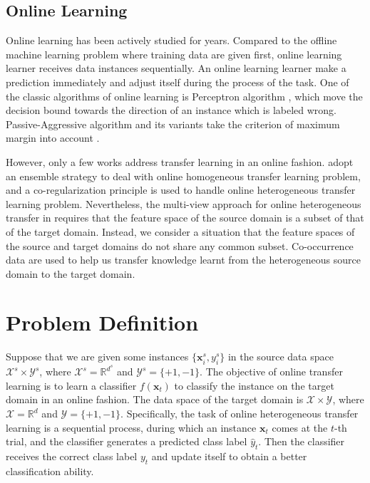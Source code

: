 \documentclass[letterpaper]{article}
\theoremstyle{remark}
\theoremstyle{definition}
\begin{document}
\subsection{Online Learning}
Online learning has been actively studied for years.
Compared to the offline machine learning problem where training data are given first, online learning learner receives data instances sequentially.
An online learning learner make a prediction immediately and adjust itself during the process of the task.
One of the classic algorithms of online learning is Perceptron algorithm \cite{rosenblatt1958perceptron}, which move the decision bound towards the direction of an instance which is labeled wrong.
Passive-Aggressive algorithm and its variants take the criterion of maximum margin into account \cite{crammer2006online}.

However, only a few works address transfer learning in an online fashion.
\cite{zhao2010otl,zhao2014online} adopt an ensemble strategy to deal with online homogeneous transfer learning problem, and a co-regularization principle is used to handle online heterogeneous transfer learning problem.
Nevertheless, the multi-view approach for online heterogeneous transfer in \cite{zhao2010otl,zhao2014online} requires that the feature space of the source domain is a subset of that of the target domain.
Instead, we consider a situation that the feature spaces of the source and target domains do not share any common subset.
Co-occurrence data are used to help us transfer knowledge learnt from the heterogeneous source domain to the target domain.

\section{Problem Definition}

Suppose that we are given some instances $\{\mathbf{x}_{i}^{s}, y_{i}^{s}\}$ in the source data space $\mathcal{X}^{s} \times \mathcal{Y}^{s}$, where $\mathcal{X}^{s} = \mathbb{R}^{d^s}$ and $\mathcal{Y}^{s} = \{+1,-1\}$.
The objective of online transfer learning is to learn a classifier $f(\mathbf{x}_{t})$ to classify the instance on the target domain in an online fashion.
The data space of the target domain is $\mathcal{X} \times \mathcal{Y}$, where $\mathcal{X} = \mathbb{R}^{d}$ and $\mathcal{Y} = \{+1,-1\}$.
Specifically, the task of online heterogeneous transfer learning is a sequential process, during which an instance $\mathbf{x}_t$ comes at the $t$-th trial, and the classifier generates a predicted class label $\hat{y}_{t}$.
Then the classifier receives the correct class label $y_t$ and update itself to obtain a better classification ability.
\end{document}
